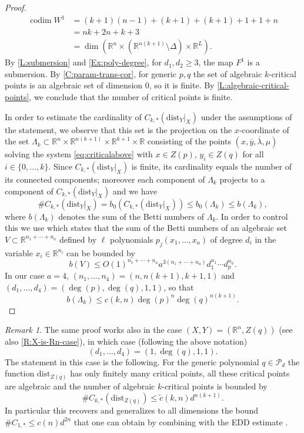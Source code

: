 \documentclass{amsart}
\newcommand{\R}{\mathbb{R}}
\newcommand{\dist}{{\mathrm{dist}_Y|_X}}
\newcommand{\Poly}{\mathscr{P}}
\theoremstyle{definition}
\theoremstyle{remark}
\newtheorem{remark}[subsubsection]{Remark}
\begin{document}
\begin{proof}
\begin{align}
\operatorname{codim} W^1 & = (k + 1) (n - 1) + (k + 1) + (k + 1) + 1 + 1 + n \\
& = nk + 2n + k + 3 \\
& = \dim(\R^n \times (\R^{n(k + 1)} \setminus \Delta) \times \R^L).
\end{align}
By \cref{L:submersion} and \cref{Ex:poly-degree}, for $d_1, d_2 \geq 3$, the map $F^1$ is a submersion. By \cref{C:param-trans-cor}, for generic $p, q$ the set of algebraic $k$-critical points is an algebraic set of dimension $0$, so it is finite. By \cref{L:algebraic-critical-points}, we conclude that the number of critical points is finite.

In order to estimate the cardinality of $C_{k, *}(\dist)$ under the assumptions of the statement, we observe that  this set is the projection on the $x$-coordinate of the set $\Lambda_k \subset \R^n\times \R^{n(k+1)}\times \R^{k+1}\times \R$ consisting of the points $(x, \overline{y}, \overline{\lambda}, \mu)$  solving the system \eqref{eq:criticalabove} with $x\in Z(p)$, $y_i\in Z(q)$ for all $i\in \{0, \ldots, k\}$. Since $C_{k, *}(\dist)$ is finite, its cardinality equals the number of its connected components; moreover each component of $\Lambda_k$ projects to a component of $C_{k, *}(\dist)$ and we have
$$\#C_{k, *}(\dist)=b_0(C_{k, *}(\dist))\leq b_0(\Lambda_k)\leq b(\Lambda_k),$$
where $b(\Lambda_k)$ denotes the sum of the Betti numbers of $\Lambda_k$. In order to control this we use \cite[Theorem 2.6]{basu2018multi} which states that the sum of the Betti numbers of an algebraic set $V\subset \R^{n_1+\cdots +n_a}$ defined by $\ell$ polynomials $p_j(x_1, \ldots, x_a)$ of degree $d_i$ in the variable $x_i\in\R^{n_i}$ can be bounded by
$$b(V)\leq O(1)^{n_1+\cdots+n_a} a^{3(n_1+\cdots+n_a)}d_1^{n_1}\cdots d_p^{n_a}.$$
In our case $a=4$, $(n_1, \ldots, n_4)=(n, n(k+1), k+1, 1)$ and $(d_1, \ldots, d_4)=(\deg(p), \deg(q), 1,1)$, so that
$$b(\Lambda_k)\leq c(k,n)\deg(p)^n\deg(q)^{n(k+1)}.$$
\end{proof}

\begin{remark}
\label{R:bottleneck-bounds}
The same proof works also in the case $(X, Y)=(\R^n, Z(q))$ (see also \cref{R:X-is-Rn-case}), in which case (following the above notation)
$$(d_1, \ldots, d_4)=(1, \deg(q), 1,1).$$ The statement in this case is the following. For the generic polynomial $q\in\Poly_d$ the function $\mathrm{dist}_{Z(q)}$ has only finitely many critical points, all these critical points are algebraic and the number of algebraic $k$-critical points is bounded by
\[
\#C_{k, *}(\mathrm{dist}_{Z(q)})\leq \widetilde{c}(k,n) d^{n(k+1)}.
\]
In particular this recovers and generalizes to all dimensions the bound $\#C_{1, *}\leq c(n)d^{2n}$ that one can obtain by combining \cite[Corollary 4.5]{Eklund2023} with the EDD estimate \cite[Corollary 2.10]{EDD_Draisma}.
\end{remark}
\end{document}
